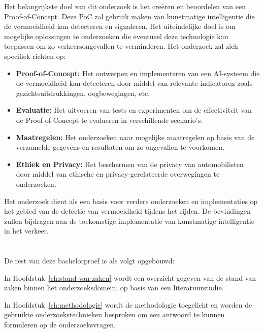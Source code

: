 Het belangrijkste doel van dit onderzoek is het creëren en beoordelen van een Proof-of-Concept. Deze PoC zal gebruik maken van kunstmatige intelligentie die de vermoeidheid kan detecteren en signaleren. Het uiteindelijke doel is om mogelijke oplossingen te onderzoeken die eventueel deze technologie kan toepassen om zo verkeersongevallen te verminderen. Het onderzoek zal zich specifiek richten op:
\begin{itemize}
    \item \textbf{Proof-of-Concept:}
    Het ontwerpen en implementeren van een AI-systeem die de vermoeidheid kan detecteren door middel van relevante indicatoren zoals gezichtsuitdrukkingen, oogbewegingen, etc.
    \item \textbf{Evaluatie:}
    Het uitvoeren van tests en experimenten om de effectiviteit van de Proof-of-Concept te evalueren in verschillende
    scenario's.
    \item \textbf{Maatregelen:}
    Het onderzoeken naar mogelijke maatregelen op basis van de verzamelde gegevens en resultaten om zo ongevallen te voorkomen.
    \item \textbf{Ethiek en Privacy:}
    Het beschermen van de privacy van automobilisten door middel van ethische en privacy-gerelateerde overwegingen te onderzoeken.
\end{itemize} 

Het onderzoek dient als een basis voor verdere onderzoeken en implementaties op het gebied van de detectie van vermoeidheid tijdens het rijden. De bevindingen zullen bijdragen aan de toekomstige implementatie van kunstmatige intelligentie in het verkeer.

\section{}%
\label{sec:opzet-bachelorproef}


De rest van deze bachelorproef is als volgt opgebouwd:

In Hoofdstuk~\ref{ch:stand-van-zaken} wordt een overzicht gegeven van de stand van zaken binnen het onderzoeksdomein, op basis van een literatuurstudie.

In Hoofdstuk~\ref{ch:methodologie} wordt de methodologie toegelicht en worden de gebruikte onderzoekstechnieken besproken om een antwoord te kunnen formuleren op de onderzoeksvragen.

